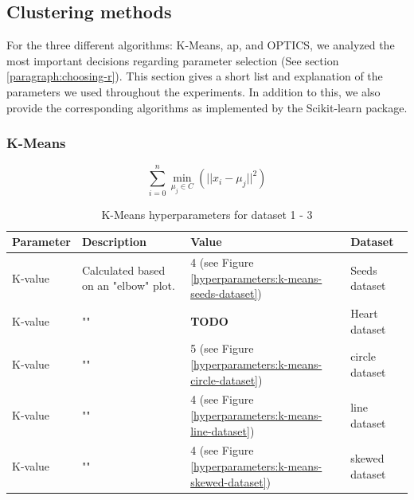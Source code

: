 \subsection{Clustering methods}
For the three different algorithms: K-Means, \gls{ap}, and OPTICS, we analyzed the most important decisions regarding parameter selection (See section \ref{paragraph:choosing-r}).
This section gives a short list and explanation of the parameters we used throughout the experiments.
In addition to this, we also provide the corresponding algorithms as implemented by the Scikit-learn package.
\subsubsection{K-Means}
\begin{equation}
  \sum_{i=0}^{n}\min_{\mu_j \in C}(||x_i - \mu_j||^2)
\end{equation}
\begin{table}[h]
  \begin{tabular}{|l|p{6cm}|l|l|}
    \hline
    Parameter & Description                          & Value                                                       & Dataset        \\ \hline
    K-value   & Calculated based on an "elbow" plot. & 4 (see Figure \ref{hyperparameters:k-means-seeds-dataset})  & Seeds dataset  \\ \hline
    K-value   & ""                                   & \textbf{TODO}                                               & Heart dataset  \\ \hline
    K-value   & ""                                   & 5 (see Figure \ref{hyperparameters:k-means-circle-dataset}) & circle dataset \\ \hline
    K-value   & ""                                   & 4 (see Figure \ref{hyperparameters:k-means-line-dataset})   & line dataset   \\ \hline
    K-value   & ""                                   & 4 (see Figure \ref{hyperparameters:k-means-skewed-dataset}) & skewed dataset \\ \hline
  \end{tabular}
  \caption{K-Means hyperparameters for dataset 1 - 3}
  \label{tab:kmeans-formula-dataset-2}
\end{table}

